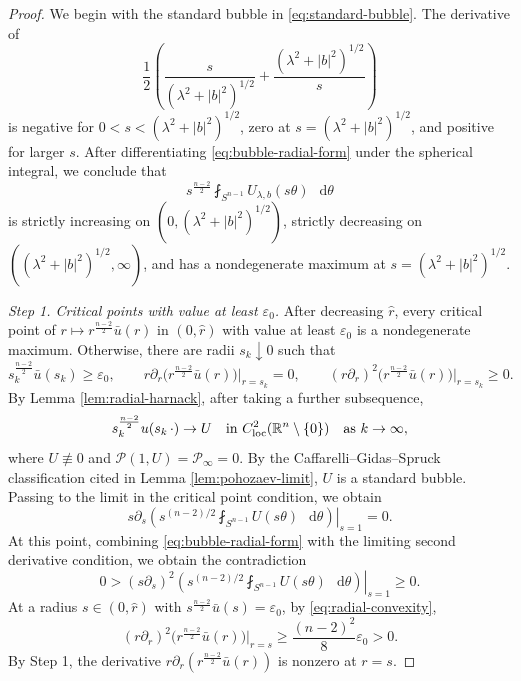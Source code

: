 \documentclass[11pt]{article}
\numberwithin{equation}{section}
\theoremstyle{remark}
\newcommand{\R}{\mathbb R}
\newcommand{\Sph}{S}
\newcommand{\cP}{\mathcal P}
\newcommand{\pa}{\partial}
\newcommand{\eps}{\varepsilon}
\newcommand{\dd}{\mathop{}\!\mathrm{d}}
\begin{document}
\par
\begin{proof}
We begin with the standard bubble in \eqref{eq:standard-bubble}.
The derivative of
\[
 \frac12\left(
 \frac{s}{(\lambda^2+|b|^2)^{1/2}}
 +\frac{(\lambda^2+|b|^2)^{1/2}}{s}
 \right)
\]
is negative for
\(0<s<(\lambda^2+|b|^2)^{1/2}\), zero at
\(s=(\lambda^2+|b|^2)^{1/2}\), and positive for larger \(s\).
After differentiating \eqref{eq:bubble-radial-form} under the spherical
integral, we conclude that
\[
 s^{\frac{n-2}{2}}\fint_{\Sph^{n-1}}U_{\lambda,b}(s\theta)\,\dd\theta
\]
is strictly increasing on
\((0,(\lambda^2+|b|^2)^{1/2})\), strictly decreasing on
\(((\lambda^2+|b|^2)^{1/2},\infty)\), and has a nondegenerate maximum at
\(s=(\lambda^2+|b|^2)^{1/2}\).

\emph{Step 1. Critical points with value at least \(\eps_0\).}
After decreasing \(\widehat r\), every critical point of
\(r\mapsto r^{\frac{n-2}{2}}\bar u(r)\) in \((0,\widehat r)\) with value at
least \(\eps_0\) is a nondegenerate maximum.
Otherwise, there are radii \(s_k\downarrow0\) such that
\[
 s_k^{\frac{n-2}{2}}\bar u(s_k)\ge\eps_0,
 \qquad
 r\pa_r\bigl(r^{\frac{n-2}{2}}\bar u(r)\bigr)\big|_{r=s_k}=0,
 \qquad
 (r\pa_r)^2\bigl(r^{\frac{n-2}{2}}\bar u(r)\bigr)\big|_{r=s_k}\ge0.
\]
By Lemma  \ref{lem:radial-harnack}, after taking a further subsequence,
\[
 s_k^{\frac{n-2}{2}}u(s_k\,\cdot)
 \to U
 \quad\text{in }C^2_{\rm loc}(\R^n\setminus\{0\})
 \quad\text{as }k\to\infty,
\]
where \(U\not\equiv0\) and \(\cP(1,U)=\cP_\infty=0\). By the
Caffarelli--Gidas--Spruck classification cited in
Lemma  \ref{lem:pohozaev-limit}, \(U\) is a standard bubble.
{Passing to the limit in the critical point condition, we obtain}
\[
 \left.s\partial_s\left(s^{(n-2)/2}
 \fint_{\Sph^{n-1}}U(s\theta)\,\dd\theta\right)\right|_{s=1}=0.
\]
{At this point, combining \eqref{eq:bubble-radial-form} with
the limiting second derivative condition, we obtain the contradiction}
\[
 0>\left.(s\partial_s)^2\left(s^{(n-2)/2}
 \fint_{\Sph^{n-1}}U(s\theta)\,\dd\theta\right)\right|_{s=1}\ge0.
\]
At a radius \(s\in(0,\widehat r)\) with
\(s^{\frac{n-2}{2}}\bar u(s)=\eps_0\),
{by \eqref{eq:radial-convexity},}
\[
 (r\pa_r)^2\bigl(r^{\frac{n-2}{2}}\bar u(r)\bigr)\big|_{r=s}
 \ge\frac{(n-2)^2}{8}\eps_0>0.
\]
By Step  1, the derivative
\(r\pa_r(r^{\frac{n-2}{2}}\bar u(r))\) is nonzero at \(r=s\).


\end{proof}
\end{document}
